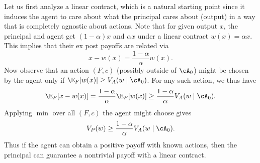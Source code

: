 Let us first analyze a linear contract, which is a natural starting point since it induces the agent to care about what the principal cares about (output) in a way that is completely agnostic about actions.
Note that for given output \(x\), the principal and agent get \((1 - \alpha) x\) and \(\alpha x\) under a linear contract \(w(x) = \alpha x\).
This implies that their ex post payoffs are related via
\[
  x - w(x)
  = \frac{1 - \alpha}{\alpha} w(x).
\]
Now observe that an action \((F, c)\) (possibly outside of \(\cA_0\)) might be chosen by the agent only if \(\E_F[w(x)] \geq V_A(w \mid \cA_0)\).
For any such action, we thus have
\[
  \E_F[x - w(x)]
  = \frac{1 - \alpha}{\alpha} \E_F[w(x)]
  \geq \frac{1 - \alpha}{\alpha} V_A(w \mid \cA_0).
\]
Applying \(\min\) over all \((F, c)\) the agent might choose gives
\[
  V_P(w) \geq \frac{1 - \alpha}{\alpha} V_A(w \mid \cA_0).
\]
Thus if the agent can obtain a positive payoff with known actions, then the principal can guarantee a nontrivial payoff with a linear contract.


